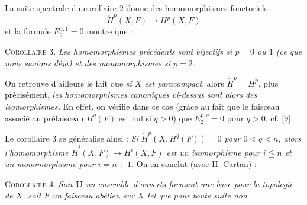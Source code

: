 La suite spectrale du corollaire 2 donne des homomorphismes fonctoriels
\[
\check H^p(X,F)\to H^p(X,F)
\]
et la formule
$E_2^{0,1}=0$
montre que :

\textsc{Corollaire 3.} \textit{Les homomorphismes précédents sont
bijectifs si $p=0$ ou $1$ \textup{(}ce que nous savions déjà\textup{)} et des monomorphismes si
$p=2$.}

On retrouve d'ailleurs le fait que \textit{si $X$ est paracompact}, alors
$\check H^p=H^p$, plus précisément, \textit{les homomorphismes canoniques
ci-dessus sont alors des isomorphismes.} En effet, on vérifie dans ce cas
(grâce au fait que le faisceau associé au préfaisceau $H^q(F)$ est nul si
$q>0$) que
$E_2^{p,q}=0$ pour $q>0$,
cf. [9].

Le corollaire 3 se généralise ainsi : \textit{Si
$\check H^p(X,H^q(F))=0$ pour $0<q<n$, alors l'homomorphisme
$\check H^i(X,F)\to H^i(X,F)$ est un isomorphisme pour $i\leqq n$
et un monomorphisme pour $i=n+1$.} On en conclut (avec H. Cartan) :

\textsc{Corollaire 4.} \textit{Soit $\mathbf U$ un ensemble
d'ouverts formant une base pour la topologie de $X$, soit $F$ un faisceau
abélien sur $X$ tel que pour toute suite non}


